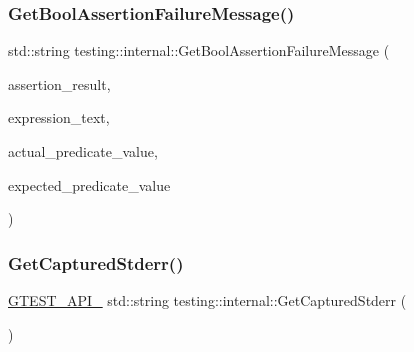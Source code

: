 \mbox{\label{namespacetesting_1_1internal_a5fd6e5dc9eb20ab3c3a80e24d89dfac6}} 
\subsubsection{\texorpdfstring{GetBoolAssertionFailureMessage()}{GetBoolAssertionFailureMessage()}}
{\footnotesize\ttfamily std\+::string testing\+::internal\+::\+Get\+Bool\+Assertion\+Failure\+Message (\begin{DoxyParamCaption}\item[{const Assertion\+Result \&}]{assertion\+\_\+result,  }\item[{const char $\ast$}]{expression\+\_\+text,  }\item[{const char $\ast$}]{actual\+\_\+predicate\+\_\+value,  }\item[{const char $\ast$}]{expected\+\_\+predicate\+\_\+value }\end{DoxyParamCaption})}

\mbox{\label{namespacetesting_1_1internal_a374156401da17704099d0c33fa53adfb}} 
\subsubsection{\texorpdfstring{GetCapturedStderr()}{GetCapturedStderr()}}
{\footnotesize\ttfamily \mbox{\hyperlink{_obj__test_2lib_2googletest-release-1_88_81_2googletest_2include_2gtest_2internal_2gtest-port_8h_aa73be6f0ba4a7456180a94904ce17790}{G\+T\+E\+S\+T\+\_\+\+A\+P\+I\+\_\+}} std\+::string testing\+::internal\+::\+Get\+Captured\+Stderr (\begin{DoxyParamCaption}{ }\end{DoxyParamCaption})}

\mbox{\label{namespacetesting_1_1internal_aed657219a9856a8d249a3230de0c54ce}} 
